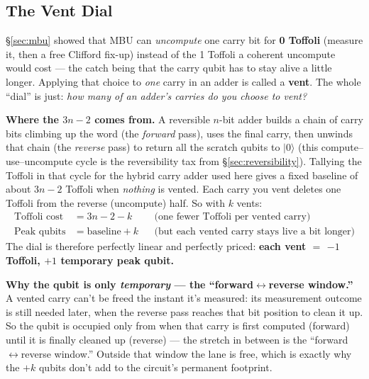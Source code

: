 \documentclass[11pt,a4paper]{article}
\newcommand{\ket}[1]{$|#1\rangle$\xspace}
\begin{document}
\subsection{The Vent Dial}

\S\ref{sec:mbu} showed that MBU can \emph{uncompute} one carry bit for \textbf{0 Toffoli} (measure
it, then a free Clifford fix-up) instead of the 1 Toffoli a coherent uncompute would cost --- the
catch being that the carry qubit has to stay alive a little longer. Applying that choice to
\emph{one} carry in an adder is called a \textbf{vent}. The whole ``dial'' is just: \emph{how many of
an adder's carries do you choose to vent?}

\textbf{Where the $3n - 2$ comes from.} A reversible $n$-bit adder builds a chain of carry bits
climbing up the word (the \emph{forward} pass), uses the final carry, then unwinds that chain (the
\emph{reverse} pass) to return all the scratch qubits to \ket{0} (this compute--use--uncompute cycle
is the reversibility tax from \S\ref{sec:reversibility}). Tallying the Toffoli in that cycle for the
hybrid carry adder used here gives a fixed baseline of about $3n - 2$ Toffoli when \emph{nothing} is
vented. Each carry you vent deletes one Toffoli from the reverse (uncompute) half. So with $k$ vents:
\begin{align*}
  \text{Toffoli cost} &= 3n - 2 - k && \text{(one fewer Toffoli per vented carry)} \\
  \text{Peak qubits}  &= \text{baseline} + k && \text{(but each vented carry stays live a bit longer)}
\end{align*}
The dial is therefore perfectly linear and perfectly priced: \textbf{each vent $=$ $-1$ Toffoli,
$+1$ temporary peak qubit.}

\textbf{Why the qubit is only \emph{temporary} --- the ``forward$\leftrightarrow$reverse window.''} A
vented carry can't be freed the instant it's measured: its measurement outcome is still needed later,
when the reverse pass reaches that bit position to clean it up. So the qubit is occupied only from
when that carry is first computed (forward) until it is finally cleaned up (reverse) --- the stretch
in between is the ``forward$\leftrightarrow$reverse window.'' Outside that window the lane is free,
which is exactly why the $+k$ qubits don't add to the circuit's permanent footprint.
\end{document}
